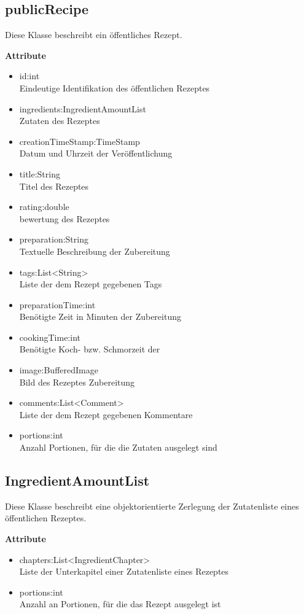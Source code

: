 \subsection{publicRecipe}
Diese Klasse beschreibt ein öffentliches Rezept.

\textbf{Attribute}
\begin{itemize}[nosep]
	\item id:int \\ Eindeutige Identifikation des öffentlichen Rezeptes
	\item ingredients:IngredientAmountList \\ Zutaten des Rezeptes
	\item creationTimeStamp:TimeStamp \\ Datum und Uhrzeit der Veröffentlichung
	\item title:String \\ Titel des Rezeptes
	\item rating:double \\ bewertung des Rezeptes
	\item preparation:String \\ Textuelle Beschreibung der Zubereitung
	\item tags:List<String> \\ Liste der dem Rezept gegebenen Tags
	\item preparationTime:int \\ Benötigte Zeit in Minuten der Zubereitung
	\item cookingTime:int \\ Benötigte Koch- bzw. Schmorzeit der
	\item image:BufferedImage \\ Bild des Rezeptes
	 Zubereitung
	\item comments:List<Comment> \\ Liste der dem Rezept gegebenen Kommentare
	\item portions:int \\ Anzahl Portionen, für die die Zutaten ausgelegt sind
\end{itemize}

\subsection{IngredientAmountList}
Diese Klasse beschreibt eine objektorientierte Zerlegung der Zutatenliste eines öffentlichen Rezeptes.

\textbf{Attribute}
\begin{itemize}[nosep]
	\item chapters:List<IngredientChapter> \\ Liste der Unterkapitel einer Zutatenliste eines Rezeptes
	\item portions:int \\ Anzahl an Portionen, für die das Rezept ausgelegt ist
\end{itemize}

